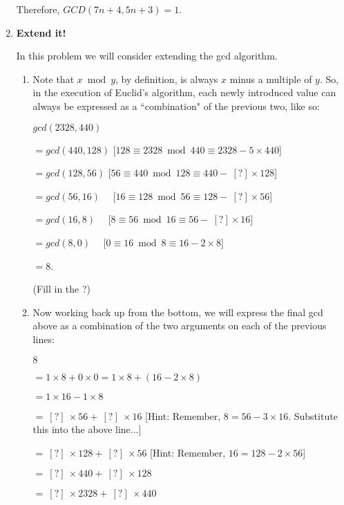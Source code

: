\documentclass[11pt]{article}
\newif\ifsolutions
\begin{document}
\begin{enumerate}
Therefore, $GCD(7n+4,5n+3)=1$.
\fi

\item {\bf Extend it!}

In this problem we will consider extending the gcd algorithm.

\begin{enumerate}

\item Note that $x \bmod y$, by definition, is always $x$ minus a multiple of $y$. So, in the execution of Euclid's algorithm, each newly introduced value can always be expressed as a ``combination" of the previous two, like so:

$ gcd(2328, 440)$ 

$= gcd(440, 128)$ [$128 \equiv 2328 \bmod{440} \equiv 2328 - 5 \times 440$] 

$= gcd(128, 56)$   [$56 \equiv 440 \bmod {128} \equiv 440 - \ [?] \times 128$]  \ifsolutions  {\bf solution}:  $[?] = 3$ \fi

$= gcd(56, 16)$ \ \  [$16 \equiv 128 \bmod{56} \equiv 128 - \ [?] \times 56$]   \ifsolutions  {\bf solution}:  $[?] = 2$ \fi

$= gcd(16, 8)$  \ \ [$8 \equiv 56 \bmod{16} \equiv 56 - \ [?] \times 16$] \ifsolutions {\bf solution}: $[?] = 3$ \fi

$= gcd(8, 0)$  \ \ [$0 \equiv 16 \bmod{8} \equiv 16 - 2 \times 8$]

$= 8$.

(Fill in the ?)


\item Now working back up from the bottom, we will express the final gcd above as a combination of the two arguments on each of the previous lines:

$8$

$= 1 \times 8 + 0 \times 0 = 1 \times 8 + (16 - 2 \times 8)$

$= 1 \times 16 - 1 \times 8$ 

$= \ [?] \ \times 56 + \ [?] \ \times 16$ [Hint: Remember, $8 = 56 - 3 \times 16$. Substitute this into the above line...] \ifsolutions{$1 \times 16 - 1 \times (56 - 3 \times 16) = -1 \times 56 + 4 \times 16$} \fi

$= \ [?] \ \times 128 + \ [?] \ \times 56$ [Hint: Remember, $16 = 128 - 2 \times 56$] \ifsolutions{$4 \times 128 - 9 \times 56$} \fi

$= \ [?] \ \times 440 + \ [?] \ \times 128$ \ifsolutions{$-9 \times 440 + 31 \times 128$} \fi

$= \ [?] \  \times 2328 + \ [?] \ \times 440$ \ifsolutions{$31 \times 2328 - 164 \times 440$} \fi


\end{enumerate}
\end{enumerate}
\end{document}
